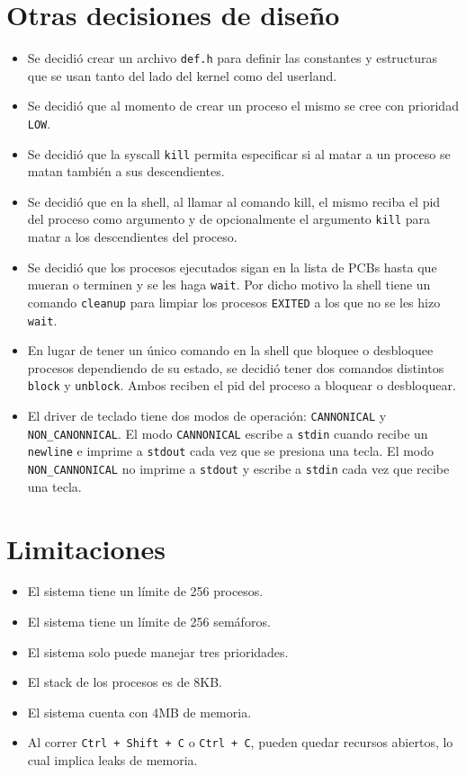 \documentclass{article}
\begin{document}
\section {Otras decisiones de diseño}
\begin{itemize}
    \item Se decidió crear un archivo \texttt{\texttt{def.h}} para definir las constantes y estructuras que se usan tanto del lado del kernel como del userland.
    \item Se decidió que al momento de crear un proceso el mismo se cree con prioridad \texttt{LOW}.
    \item Se decidió que la syscall \texttt{kill} permita especificar si al matar a un proceso se matan también a sus descendientes.
    \item Se decidió que en la shell, al llamar al comando kill, el mismo reciba el pid del proceso como argumento y de opcionalmente el argumento \texttt{kill} para matar a los descendientes del proceso.
    \item Se decidió que los procesos ejecutados sigan en la lista de PCBs hasta que mueran o terminen y se les haga \texttt{wait}. Por dicho motivo la shell tiene un comando \texttt{cleanup} para limpiar los procesos \texttt{EXITED} a los que no se les hizo \texttt{wait}.\item En lugar de tener un único comando en la shell que bloquee o desbloquee procesos dependiendo de su estado, se decidió tener dos comandos distintos \texttt{block} y \texttt{unblock}. Ambos reciben el pid del proceso a bloquear o desbloquear.
    \item El driver de teclado tiene dos modos de operación: \texttt{CANNONICAL} y \texttt{NON\_CANONNICAL}. El modo \texttt{CANNONICAL} escribe a \texttt{stdin} cuando recibe un \texttt{newline} e imprime a \texttt{stdout} cada vez que se presiona una tecla. El modo \texttt{NON\_CANNONICAL} no imprime a \texttt{stdout} y escribe a \texttt{stdin} cada vez que recibe una tecla.
\end{itemize}

\section {Limitaciones}
\begin{itemize}
    \item El sistema tiene un límite de 256 procesos.
    \item El sistema tiene un límite de 256 semáforos.
    \item El sistema solo puede manejar tres prioridades.
    \item El stack de los procesos es de 8KB.
    \item El sistema cuenta con 4MB de memoria.
    \item Al correr \texttt{Ctrl + Shift + C} o \texttt{Ctrl + C}, pueden quedar recursos abiertos, lo cual implica leaks de memoria.
\end{itemize}
\end{document}
